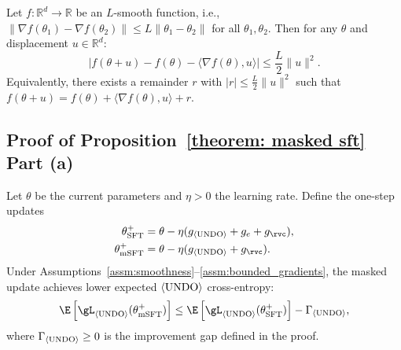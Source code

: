 \begin{lemma}\label{lemma:second_order_remainder}
Let $f: \mathbb{R}^d \to \mathbb{R}$ be an $L$-smooth function, i.e., $\|\nabla f(\theta_1) - \nabla f(\theta_2)\| \leq L\|\theta_1 - \theta_2\|$ for all $\theta_1, \theta_2$. Then for any $\theta$ and displacement $u \in \mathbb{R}^d$:
\begin{equation}
    \left| f(\theta + u) - f(\theta) - \langle \nabla f(\theta), u \rangle \right| \leq \frac{L}{2}\|u\|^2.
\end{equation}
Equivalently, there exists a remainder $r$ with $|r| \leq \frac{L}{2}\|u\|^2$ such that $f(\theta + u) = f(\theta) + \langle \nabla f(\theta), u \rangle + r$.
\end{lemma}


\subsection{Proof of Proposition~\ref{theorem: masked sft} Part (a)}

\begin{proposition}
Let $\theta$ be the current parameters and $\eta > 0$ the learning rate. Define the one-step updates
\begin{align}
    \theta_\text{SFT}^+ &= \theta - \eta (g_{\bk} + g_e + g_\rvc), \\
    \theta_\text{mSFT}^+ &= \theta - \eta (g_{\bk} + g_\rvc).
\end{align}
Under Assumptions~\ref{assm:smoothness}--\ref{assm:bounded_gradients}, the masked update achieves lower expected $\langle\textnormal{UNDO}\rangle$ cross-entropy:
\begin{equation}
    \E\left[\gL_{\bk}(\theta_\text{mSFT}^+)\right] \leq \E\left[\gL_{\bk}(\theta_\text{SFT}^+)\right] - \Gamma_{\bk},
\end{equation}
where $\Gamma_{\langle\textnormal{UNDO}\rangle} \geq 0$ is the improvement gap defined in the proof.
\end{proposition}

